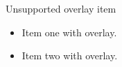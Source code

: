 \documentclass[14pt,t]{beamer}
\begin{document}
\begin{frame}{Unsupported overlay item}
\begin{itemize}
\item<1-> Item one with overlay.
\item<2-> Item two with overlay.
\end{itemize}
\end{frame}
\end{document}
